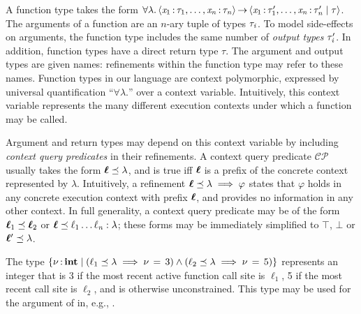 A function type takes the form
$ \forall  \lambda .\left\langle{ \mathit{x_{{\mathrm{1}}}} \operatorname{:}\tau_{{\mathrm{1}}} ,\dots, \mathit{x_{\mathit{n}}} \operatorname{:}\tau_{\mathit{n}} }\right\rangle\operatorname{\rightarrow}\left\langle{ \mathit{x_{{\mathrm{1}}}} \operatorname{:}\tau'_{{\mathrm{1}}} ,\dots, \mathit{x_{\mathit{n}}} \operatorname{:}\tau'_{\mathit{n}}  \mid  \tau }\right\rangle $.
The arguments of a function are an $n$-ary tuple of types $\tau_{\mathit{i}}$.
To model side-effects on arguments, the function type includes the same number of \emph{output types}
$\tau'_{\mathit{i}}$. In addition, function types have a direct return type $\tau$. 
The argument and output types are given names: refinements within the function type
may refer to these names.
Function types in our language are context polymorphic,
expressed by universal quantification ``$\forall \lambda.$''
over a context variable. Intuitively,
this context variable represents the many different execution contexts
under which a function may be called.

Argument and return types may depend on this context variable by
including \emph{context query predicates} in their refinements.
A context query predicate $\mathcal{CP}$ usually takes the
form $  \oldvec{\ell}     \preceq    \lambda $, and is true iff $\oldvec{\ell}$ is a
prefix of the concrete context represented by $\lambda$.
Intuitively, a refinement $  \oldvec{\ell}     \preceq    \lambda   \implies  \varphi$
states that $\varphi$ holds in any concrete execution context
with prefix $\oldvec{\ell}$, and provides no information in any other
context. In full generality, a context query predicate may
be of the form $  \oldvec{\ell}_{{\mathrm{1}}}     \preceq    \oldvec{\ell}_{{\mathrm{2}}} $ or $  \oldvec{\ell}     \preceq     \ell_{{\mathrm{1}}} \ldots \ell_{\ottmv{n}}   \ottsym{:}  \lambda $;
these forms may be immediately simplified to
$ \top $, $ \bot $ or $  \oldvec{\ell}'     \preceq    \lambda $.

\begin{example}
  \label{exmp:cs-type-example}
  The type $ \left\{{  \nu  \operatorname{:} \mathbf{int} \mid   (    \ell_{{\mathrm{1}}}     \preceq    \lambda   \implies  \nu \, = \, 3  )  \wedge  (    \ell_{{\mathrm{2}}}     \preceq    \lambda   \implies  \nu \, = \, 5  )  }\right\} $ represents
  an integer that is 3 if the most recent active
  function call site is $\ell_{{\mathrm{1}}}$, 5 if the most recent call site is $\ell_{{\mathrm{2}}}$,
  and is otherwise unconstrained. This type may be used for the argument of
   in, e.g., .
\end{example}

